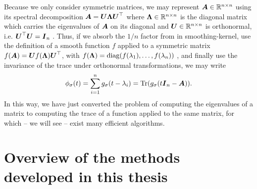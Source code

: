 Because we only consider symmetric matrices, 
we may represent $\boldsymbol{A} \in \mathbb{R}^{n \times n}$ using its spectral
decomposition $\boldsymbol{A} = \boldsymbol{U} \boldsymbol{\Lambda} \boldsymbol{U}^{\top}$ where
$\boldsymbol{\Lambda} \in \mathbb{R}^{n \times n}$ is the diagonal matrix which carries
the eigenvalues of $\boldsymbol{A}$ on its diagonal and $\boldsymbol{U} \in \mathbb{R}^{n \times n}$
is orthonormal, i.e. $\boldsymbol{U}^{\top} \boldsymbol{U} = \boldsymbol{I}_n$ \cite[theorem~4.1.5]{horn1985matrix}.
Thus, if we absorb the $1/n$ factor from 
in \gls{smoothing-kernel},
use the definition of a smooth function $f$ applied to a symmetric matrix
$f(\boldsymbol{A}) = \boldsymbol{U} f(\boldsymbol{\Lambda}) \boldsymbol{U}^{\top}$,
with $f(\boldsymbol{\Lambda}) = \operatorname{diag}(f(\lambda_1), \dots, f(\lambda_n))$ \cite[definition~1.2]{higham2008functions},
and finally use the invariance of the trace under orthonormal transformations, we may write
\begin{equation}
    \phi_{\sigma}(t) = \sum_{i=1}^n g_{\sigma}(t - \lambda_i) = \operatorname{Tr}(g_{\sigma}(t\boldsymbol{I}_n - \boldsymbol{A})).
    \label{equ:1-introduction-spectral-density-as-trace}
\end{equation}
In this way, we have just converted the problem of computing the eigenvalues of
a matrix to computing the trace of a function applied to the same matrix,
for which -- we will see -- exist many efficient algorithms.


\section{Overview of the methods developed in this thesis}
\label{sec:1-introduction-overview}

